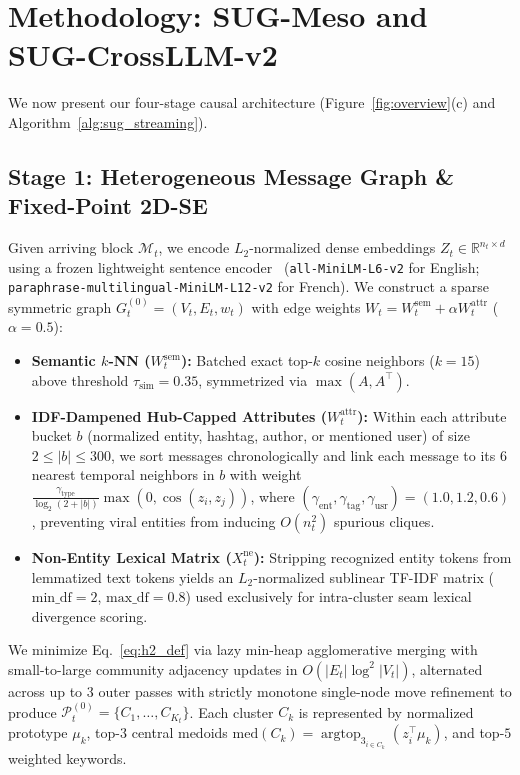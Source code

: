 \section{Methodology: SUG-Meso and SUG-CrossLLM-v2}
\label{sec:method}

We now present our four-stage causal architecture (Figure~\ref{fig:overview}(c) and Algorithm~\ref{alg:sug_streaming}).

\subsection{Stage 1: Heterogeneous Message Graph \& Fixed-Point 2D-SE}
Given arriving block $\mathcal{M}_t$, we encode $L_2$-normalized dense embeddings $Z_t \in \mathbb{R}^{n_t \times d}$ using a frozen lightweight sentence encoder~\citep{reimers2019sentence} (\texttt{all-MiniLM-L6-v2} for English; \texttt{paraphrase-multilingual-MiniLM-L12-v2} for French). We construct a sparse symmetric graph $G_t^{(0)} = (V_t, E_t, w_t)$ with edge weights $W_t = W_t^{\text{sem}} + \alpha W_t^{\text{attr}}$ ($\alpha = 0.5$):
\begin{itemize}
    \item \textbf{Semantic $k$-NN ($W_t^{\text{sem}}$):} Batched exact top-$k$ cosine neighbors ($k=15$) above threshold $\tau_{\text{sim}}=0.35$, symmetrized via $\max(A, A^\top)$.
    \item \textbf{IDF-Dampened Hub-Capped Attributes ($W_t^{\text{attr}}$):} Within each attribute bucket $b$ (normalized entity, hashtag, author, or mentioned user) of size $2 \le |b| \le 300$, we sort messages chronologically and link each message to its $6$ nearest temporal neighbors in $b$ with weight $\frac{\gamma_{\text{type}}}{\log_2(2+|b|)}\max(0, \cos(z_i, z_j))$, where $(\gamma_{\text{ent}}, \gamma_{\text{tag}}, \gamma_{\text{usr}}) = (1.0, 1.2, 0.6)$, preventing viral entities from inducing $O(n_t^2)$ spurious cliques.
    \item \textbf{Non-Entity Lexical Matrix ($X_t^{\text{ne}}$):} Stripping recognized entity tokens from lemmatized text tokens yields an $L_2$-normalized sublinear TF-IDF matrix ($\text{min\_df}=2$, $\text{max\_df}=0.8$) used exclusively for intra-cluster seam lexical divergence scoring.
\end{itemize}
We minimize Eq.~\eqref{eq:h2_def} via lazy min-heap agglomerative merging with small-to-large community adjacency updates in $O(|E_t|\log^2 |V_t|)$, alternated across up to $3$ outer passes with strictly monotone single-node move refinement to produce $\mathcal{P}_t^{(0)} = \{C_1, \dots, C_{K_t}\}$. Each cluster $C_k$ is represented by normalized prototype $\mu_k$, top-$3$ central medoids $\text{med}(C_k) = \operatorname{argtop}_3_{i \in C_k}(z_i^\top \mu_k)$, and top-$5$ weighted keywords.


